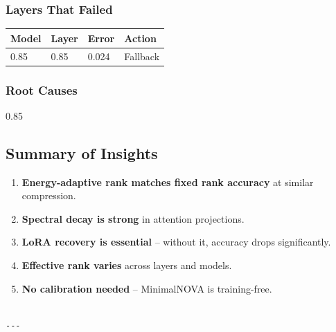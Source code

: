 \subsubsection{Layers That Failed}

\begin{table}[H]
\centering
\small
\begin{tabular}{llll}
\toprule
\textbf{Model} & \textbf{Layer} & \textbf{Error} & \textbf{Action} \\
\midrule
0.85 & 0.85 & 0.024 & Fallback \\
\bottomrule
\end{tabular}
\end{table}

\subsubsection{Root Causes}

0.85

\subsection{Summary of Insights}

\begin{enumerate}
\item \textbf{Energy-adaptive rank matches fixed rank accuracy} at similar compression.
\item \textbf{Spectral decay is strong} in attention projections.
\item \textbf{LoRA recovery is essential} -- without it, accuracy drops significantly.
\item \textbf{Effective rank varies} across layers and models.
\item \textbf{No calibration needed} -- MinimalNOVA is training-free.
\end{enumerate}
\begin{lstlisting}

---
\end{lstlisting}